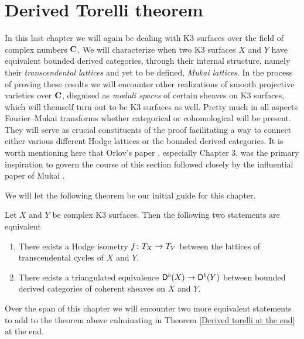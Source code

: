 \section{Derived Torelli theorem}
\label{Chapter: Derived Torelli theorem}

In this last chapter we will again be dealing with K3 surfaces over the field of complex numbers $\mathbf C$. We will characterize when two K3 surfaces $X$ and $Y$ have equivalent bounded derived categories, through their internal structure, namely their \emph{transcendental lattices} and yet to be defined, \emph{Mukai lattices}. In the process of proving these results we will encounter other realizations of smooth projective varieties over $\mathbf C$, disguised as \emph{moduli spaces} of certain sheaves on K3 surfaces, which will themself turn out to be K3 surfaces as well.
Pretty much in all aspects Fourier--Mukai transforms whether categorical or cohomological will be present. They will serve as crucial constituents of the proof facilitating a way to connect either various different Hodge lattices or the bounded derived categories. It is worth mentioning here that Orlov's paper \cite[]{Orlov2003}, especially Chapter 3, was the primary inspiration to govern the course of this section followed closely by the influential paper of Mukai \cite{Mukai1987}.


We will let the following theorem be our initial guide for this chapter.
\begin{theorem}
    Let $X$ and $Y$ be complex K3 surfaces. Then the following two statements are equivalent
    \begin{enumerate}[label = \roman*.]
        \item{There exists a Hodge isometry $f \colon T_{X} \to T_{Y}$ between the lattices of transcendental cycles of $X$ and $Y$.}
        \item{There exists a triangulated equivalence $\mathsf{D}^b(X) \to \mathsf{D}^b(Y)$ between bounded derived categories of coherent sheaves on $X$ and $Y$.} 
    \end{enumerate}
\end{theorem}
Over the span of this chapter we will encounter two more equivalent statements to add to the theorem above
culminating in Theorem \ref{Derived torelli at the end} at the end. 


